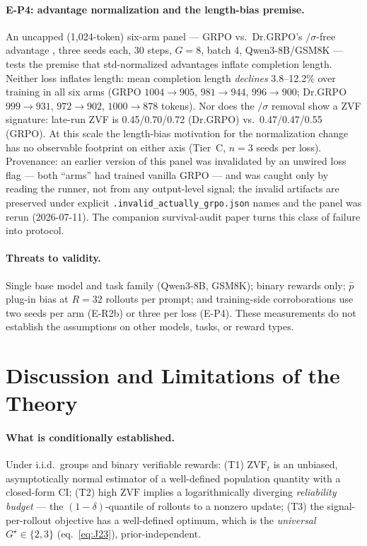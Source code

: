\documentclass[11pt]{article}
\theoremstyle{plain}
\theoremstyle{definition}
\theoremstyle{remark}
\newcommand{\ZVF}{\ensuremath{\mathrm{ZVF}}}
\newcommand{\1}{\mathbb{1}}
\begin{document}
\paragraph{E-P4: advantage normalization and the length-bias premise.}
An uncapped (1{,}024-token) six-arm panel --- GRPO vs.\ Dr.GRPO's
$/\sigma$-free advantage \cite{tong2025drgrpo}, three seeds each, 30
steps, $G{=}8$, batch 4, Qwen3-8B/GSM8K --- tests the premise that
std-normalized advantages inflate completion length. Neither loss
inflates length: mean completion length \emph{declines} 3.8--12.2\% over
training in all six arms (GRPO $1004{\to}905$, $981{\to}944$,
$996{\to}900$; Dr.GRPO $999{\to}931$, $972{\to}902$, $1000{\to}878$
tokens). Nor does the $/\sigma$ removal show a ZVF signature: late-run
ZVF is 0.45/0.70/0.72 (Dr.GRPO) vs.\ 0.47/0.47/0.55 (GRPO). At this
scale the length-bias motivation for the normalization change has no
observable footprint on either axis (Tier~C, $n{=}3$ seeds per loss).
Provenance: an earlier version of this panel was invalidated by an
unwired loss flag --- both ``arms'' had trained vanilla GRPO --- and was
caught only by reading the runner, not from any output-level signal; the
invalid artifacts are preserved under explicit
\texttt{.invalid\_actually\_grpo.json} names and the panel was rerun
(2026-07-11). The companion survival-audit paper turns this class of
failure into protocol.

\paragraph{Threats to validity.} Single base model and task family
(Qwen3-8B, GSM8K); binary rewards only; $\hat p$ plug-in bias at $R{=}32$
rollouts per prompt; and training-side corroborations use two seeds per
arm (E-R2b) or three per loss (E-P4).
These measurements do not establish the assumptions on other models, tasks, or
reward types.

\section{Discussion and Limitations of the Theory}\label{sec:discussion}
\paragraph{What is conditionally established.} Under i.i.d.\ groups and binary
verifiable rewards: (T1) $\ZVF_t$ is an unbiased, asymptotically normal
estimator of a well-defined population quantity with a closed-form CI; (T2)
high \ZVF{} implies a logarithmically diverging \emph{reliability budget} ---
the $(1{-}\delta)$-quantile of rollouts to a nonzero update; (T3) the
signal-per-rollout objective has a well-defined optimum, which is the
\emph{universal} $G^\star\in\{2,3\}$ (eq.~\ref{eq:J23}), prior-independent.
\end{document}
